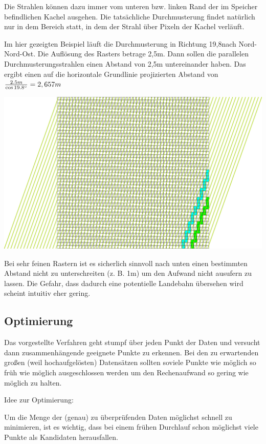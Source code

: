 \documentclass[
11pt, %
a4paper, %
oneside, %
pdfspacing, %
headinclude,
BCOR5mm, %
ngerman, %
bibtotocnumbered,
]{scrartcl}
\begin{document}
	Die Strahlen können dazu immer vom unteren bzw. linken Rand der im Speicher befindlichen Kachel ausgehen. Die tatsächliche Durchmusterung findet natürlich nur in dem Bereich statt, in dem der Strahl über Pixeln der Kachel verläuft.
	
	Im hier gezeigten Beispiel läuft die Durchmusterung in Richtung 19,8\degree nach Nord-Nord-Ost. Die Auflösung des Rasters betrage 2,5m. Dann sollen die parallelen Durchmusterungsstrahlen einen Abstand von 2,5m untereinander haben. Das ergibt einen auf die horizontale Grundlinie projizierten Abstand von $\frac{2.5m}{\cos 19.8\degree} = 2,657m$
	
	\includegraphics[width=\textwidth]{./drawings/Durchmusterungspfade_schraeg.png}
	
	Bei sehr feinen Rastern ist es sicherlich sinnvoll nach unten einen bestimmten Abstand nicht zu unterschreiten (z. B. 1m) um den Aufwand nicht ausufern zu lassen. Die Gefahr, dass dadurch eine potentielle Landebahn übersehen wird scheint intuitiv eher gering.

	

\subsection{Optimierung}

Das vorgestellte Verfahren geht stumpf über jeden Punkt der Daten und versucht dann zusammenhängende geeignete Punkte zu erkennen. Bei den zu erwartenden großen (weil hochaufgelösten) Datensätzen sollten soviele Punkte wie möglich so früh wie möglich ausgeschlossen werden um den Rechenaufwand so gering wie möglich zu halten.

Idee zur Optimierung:

Um die Menge der (genau) zu überprüfenden Daten möglichst schnell zu minimieren, ist es wichtig, dass bei einem frühen Durchlauf schon möglichst viele Punkte als Kandidaten herausfallen.
\end{document}
